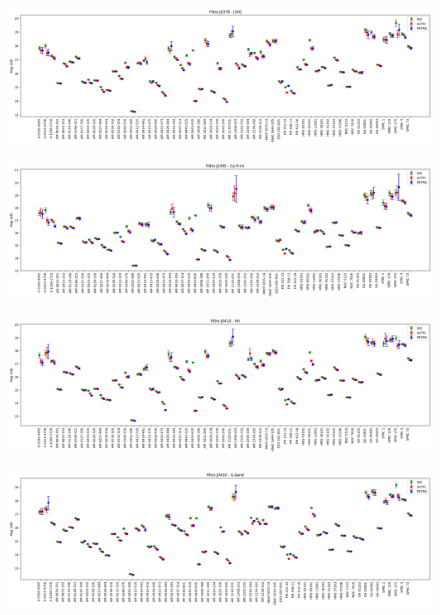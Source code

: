 \begin{anexosenv}
    \begin{figure}[h]
        \centering
        \includegraphics[width=1.0\textwidth]{Imagens/galaxias_horizontal_J0378.png}
        \caption[]{}
        \label{fig:galaxias_horizontal_J0378} 
    \end{figure}

    \begin{figure}[h]
        \centering
        \includegraphics[width=1.0\textwidth]{Imagens/galaxias_horizontal_J0395.png}
        \caption[]{}
        \label{fig:galaxias_horizontal_J0395} 
    \end{figure}

    \begin{figure}[h]
        \centering
        \includegraphics[width=1.0\textwidth]{Imagens/galaxias_horizontal_J0410.png}
        \caption[]{}
        \label{fig:galaxias_horizontal_J0410} 
    \end{figure}

    \begin{figure}[h]
        \centering
        \includegraphics[width=1.0\textwidth]{Imagens/galaxias_horizontal_J0430.png}
        \caption[]{}
        \label{fig:galaxias_horizontal_J0430} 
    \end{figure}


\end{anexosenv}
